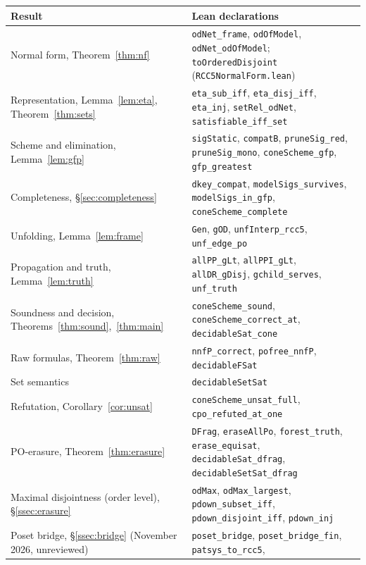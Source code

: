 \documentclass[11pt]{article}
\newcommand{\code}[1]{\texttt{#1}}
\theoremstyle{plain}
\theoremstyle{definition}
\begin{document}
\begin{table}[t]
\centering
\small
\renewcommand{\arraystretch}{1.2}
\begin{tabular}{@{}L{0.42\textwidth}L{0.52\textwidth}@{}}
\toprule
Result & Lean declarations\\
\midrule
Normal form, Theorem~\ref{thm:nf} & \code{odNet\_frame}, \code{odOfModel},
  \code{odNet\_odOfModel}; \code{toOrderedDisjoint} (\texttt{RCC5NormalForm.lean})\\
Representation, Lemma~\ref{lem:eta}, Theorem~\ref{thm:sets} &
  \code{eta\_sub\_iff}, \code{eta\_disj\_iff}, \code{eta\_inj},
  \code{setRel\_odNet}, \code{satisfiable\_iff\_set}\\
Scheme and elimination, Lemma~\ref{lem:gfp} & \code{sigStatic}, \code{compatB},
  \code{pruneSig\_red}, \code{pruneSig\_mono}, \code{coneScheme\_gfp},
  \code{gfp\_greatest}\\
Completeness, \S\ref{sec:completeness} & \code{dkey\_compat},
  \code{modelSigs\_survives}, \code{modelSigs\_in\_gfp},
  \code{coneScheme\_complete}\\
Unfolding, Lemma~\ref{lem:frame} & \code{Gen}, \code{gOD}, \code{unfInterp\_rcc5},
  \code{unf\_edge\_po}\\
Propagation and truth, Lemma~\ref{lem:truth} & \code{allPP\_gLt},
  \code{allPPI\_gLt}, \code{allDR\_gDisj}, \code{gchild\_serves},
  \code{unf\_truth}\\
Soundness and decision, Theorems~\ref{thm:sound},~\ref{thm:main} &
  \code{coneScheme\_sound}, \code{coneScheme\_correct\_at},
  \code{decidableSat\_cone}\\
Raw formulas, Theorem~\ref{thm:raw} & \code{nnfP\_correct}, \code{pofree\_nnfP},
  \code{decidableFSat}\\
Set semantics & \code{decidableSetSat}\\
Refutation, Corollary~\ref{cor:unsat} & \code{coneScheme\_unsat\_full},
  \code{cpo\_refuted\_at\_one}\\
PO-erasure, Theorem~\ref{thm:erasure} & \code{DFrag}, \code{eraseAllPo},
  \code{forest\_truth}, \code{erase\_equisat}, \code{decidableSat\_dfrag},
  \code{decidableSetSat\_dfrag}\\
Maximal disjointness (order level), \S\ref{ssec:erasure} & \code{odMax},
  \code{odMax\_largest}, \code{pdown\_subset\_iff}, \code{pdown\_disjoint\_iff},
  \code{pdown\_inj}\\
Poset bridge, \S\ref{ssec:bridge} (November 2026, unreviewed) &
  \code{poset\_bridge}, \code{poset\_bridge\_fin}, \code{patsys\_to\_rcc5},

\end{tabular}
\end{table}
\end{document}
